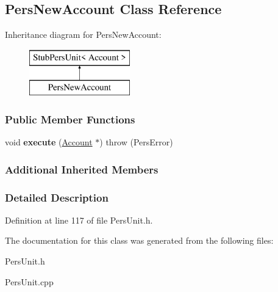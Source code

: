 \hypertarget{classPersNewAccount}{\subsection{Pers\-New\-Account Class Reference}
\label{dc/d6d/classPersNewAccount}
}
Inheritance diagram for Pers\-New\-Account\-:\begin{figure}[H]
\begin{center}
\leavevmode
\includegraphics[height=2.000000cm]{dc/d6d/classPersNewAccount}
\end{center}
\end{figure}
\subsubsection*{Public Member Functions}
\begin{DoxyCompactItemize}
\item 
\hypertarget{classPersNewAccount_a87856dc414f6f409b86a9f6120f6e2f1}{void {\bfseries execute} (\hyperlink{classAccount}{Account} $\ast$)  throw (\-Pers\-Error)}\label{dc/d6d/classPersNewAccount_a87856dc414f6f409b86a9f6120f6e2f1}

\end{DoxyCompactItemize}
\subsubsection*{Additional Inherited Members}


\subsubsection{Detailed Description}


Definition at line 117 of file Pers\-Unit.\-h.



The documentation for this class was generated from the following files\-:\begin{DoxyCompactItemize}
\item 
Pers\-Unit.\-h\item 
Pers\-Unit.\-cpp\end{DoxyCompactItemize}
